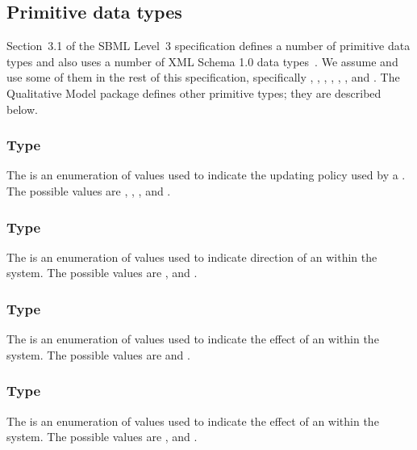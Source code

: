 \subsection{Primitive data types}
\label{primitive-types}

Section~3.1 of the SBML Level~3 specification defines a number of
primitive data types and also uses a number of XML Schema 1.0 data
types~\citep{biron:2000}.  We assume and use some of them in the rest of
this specification, specifically , ,
, , ,
, and . The Qualitative Model package defines other primitive types;
they are described below.


\subsubsection{Type \fixttspace{}}
\label{primtype-temporisation}

The  is an enumeration of values used to indicate the updating policy used by a \Transition.  The possible values are , , ,  and .

\subsubsection{Type \fixttspace{}}
\label{primtype-sign}

The  is an enumeration of values used to indicate direction of an \Input within the system.  The possible values are ,  and .

\subsubsection{Type \fixttspace{}}
\label{primtype-inputeffect}
The  is an enumeration of values used to indicate the effect of an \Input \Transition within the system.  The possible values are  and .

\subsubsection{Type \fixttspace{}}
\label{primtype-outputeffect}
The  is an enumeration of values used to indicate the effect of an \Output \Transition within the system.  The possible values are ,  and .

